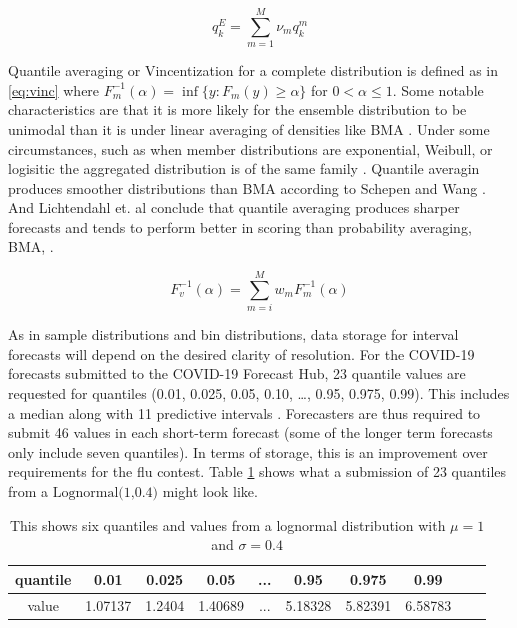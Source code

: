 \documentclass[11pt,notitlepage]{isuthesis}
\begin{document}
\begin{equation}
\label{eq:qa}
  q^E_k = \sum_{m=1}^M \nu_m q_k^m 
\end{equation}



Quantile averaging or Vincentization for a complete distribution is defined as
in \eqref{eq:vinc}
where $F_m^{-1} (\alpha) = \inf \{y:F_m(y) \geq \alpha\}$ for 
$0 < \alpha \leq 1$. Some notable characteristics are that it is more likely for
the ensemble distribution
to be unimodal than it is under linear averaging of densities like BMA 
\cite{busetti2017quantile}. Under some circumstances, such as when member
distributions are exponential, Weibull, or logisitic the aggregated distribution
is of the same family \cite{ratcliff1979group}. Quantile averagin produces 
smoother
distributions than BMA according to Schepen and Wang \cite{schepen2015model}.
And Lichtendahl et. al conclude that quantile averaging produces sharper 
forecasts
and tends to perform better in scoring than probability averaging, BMA,
\cite{lichtendahl2013better}.

\begin{equation}
\label{eq:vinc}
  F_v^{-1}(\alpha) = \sum_{m=i}^M w_m F_m^{-1} (\alpha)
\end{equation}


As in sample distributions and bin distributions, 
data storage for interval forecasts will
depend on the desired clarity of resolution. For the COVID-19 forecasts 
submitted to the COVID-19 Forecast Hub, 23 quantile values are requested for 
quantiles (0.01, 0.025, 0.05, 0.10, …, 0.95, 0.975, 0.99). This includes a 
median along with 11 predictive intervals \cite{bracher2021evaluating}. 
Forecasters are thus required to submit 46 values in each short-term forecast 
(some of the longer term forecasts only include seven quantiles). In terms of 
storage, this is an improvement over requirements for the flu contest. Table
\ref{table:qstor} shows what a submission of 23 quantiles from a 
$\mbox{Lognormal(1,0.4)}$ might look like.



\begin{table}[h!]
\centering
\begin{center}

\captionsetup{font=scriptsize}

 \begin{tabular}{|c||c|c|c|c|c|c|c|c|c|}
 \hline
    quantile & 0.01 & 0.025 & 0.05  & ...  & 0.95 & 0.975 & 0.99 \\ \hline
    value & 1.07137 & 1.2404 & 1.40689 & ... & 5.18328 &
    5.82391 & 6.58783 \\
    
 \hline
 \end{tabular}
 \begin{minipage}{10cm}
 \caption[Quantiles and values storage]{This shows six quantiles
 and values from a lognormal distribution with $\mu = 1$ and $\sigma = 0.4$}
 \label{table:qstor}
 \end{minipage}
 \end{center}
\end{table}
\end{document}

